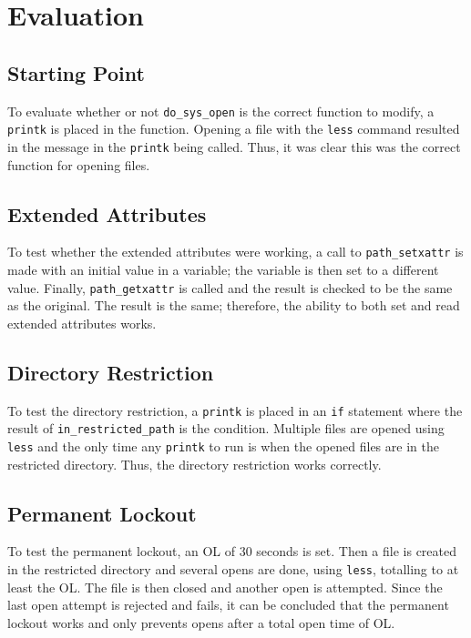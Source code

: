\section{Evaluation}

\subsection{Starting Point}

To evaluate whether or not \texttt{do\_sys\_open} is the correct function to modify, a \texttt{printk} is placed in the function. Opening a file with the \texttt{less} command resulted in the message in the \texttt{printk} being called. Thus, it was clear this was the correct function for opening files.

\subsection{Extended Attributes}

To test whether the extended attributes were working, a call to \texttt{path\_setxattr} is made with an initial value in a variable; the variable is then set to a different value. Finally, \texttt{path\_getxattr} is called and the result is checked to be the same as the original. The result is the same; therefore, the ability to both set and read extended attributes works.

\subsection{Directory Restriction}

To test the directory restriction, a \texttt{printk} is placed in an \texttt{if} statement where the result of \texttt{in\_restricted\_path} is the condition. Multiple files are opened using \texttt{less} and the only time any \texttt{printk} to run is when the opened files are in the restricted directory. Thus, the directory restriction works correctly.

\subsection{Permanent Lockout}

To test the permanent lockout, an OL of 30 seconds is set. Then a file is created in the restricted directory and several opens are done, using \texttt{less}, totalling to at least the OL. The file is then closed and another open is attempted. Since the last open attempt is rejected and fails, it can be concluded that the permanent lockout works and only prevents opens after a total open time of OL.

